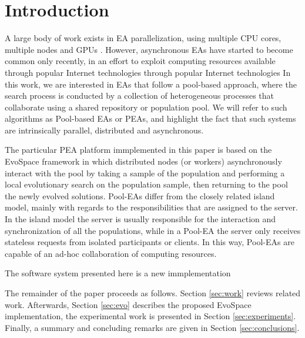 \section{Introduction}
A large body of work exists in EA parallelization, using multiple CPU cores, multiple 
nodes and GPUs \cite{cantu2000efficient,hofmann2013performance}.
However, asynchronous EAs have started to become common only recently, 
in an effort to exploit computing resources available through popular Internet technologies
through popular Internet technologies
In this work, we are interested in EAs that follow a
pool-based approach, where the search process is conducted by a
collection of heterogeneous processes that collaborate using
a shared repository or population pool. We will refer to such
algorithms as Pool-based EAs or PEAs, and highlight the fact that such
systems are intrinsically parallel, distributed and asynchronous.

The particular PEA platform immplemented in this paper is based on  
the EvoSpace framework \cite{GValdez2015} in which distributed nodes 
(or workers) asynchronously interact  with the pool by taking a sample 
of the population and performing a local evolutionary search on 
the population sample, then returning to the pool the newly evolved solutions. 
Pool-EAs differ from the closely related island model, mainly with regards to 
the responsibilities that are assigned to the server. In the island model 
the server is usually responsible for the interaction and synchronization 
of all the populations, while in a Pool-EA the server only receives stateless
requests from isolated participants or clients. In this way, Pool-EAs 
are capable of an ad-hoc collaboration of computing resources. 

The software system presented here is a new immplementation 

The remainder of the paper proceeds as follows.  Section \ref{sec:work} 
reviews related work. Afterwards, Section \ref{sec:evo} describes the
proposed EvoSpace implementation, the experimental work is presented in 
Section \ref{sec:experiments}. Finally, a summary and concluding remarks are given in
Section \ref{sec:conclusions}.


